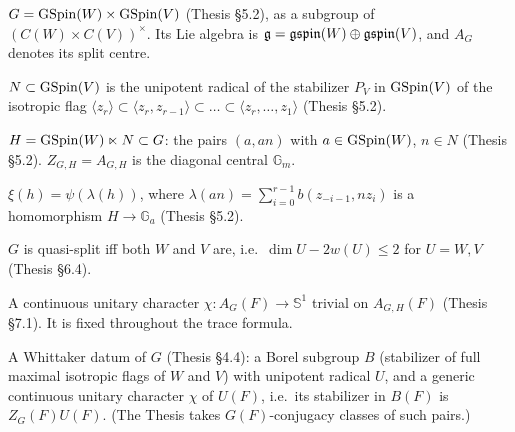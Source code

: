 \begin{definition}
\label{G}
\leanok
{}
$G = \mathrm{GSpin}(W)\times\mathrm{GSpin}(V)$ (Thesis \S5.2), as a subgroup of $(C(W)\times C(V))^\times$.
Its Lie algebra is $\mathfrak g = \mathfrak{gspin}(W)\oplus\mathfrak{gspin}(V)$, and $A_G$ denotes its split centre.
\end{definition}

\begin{definition}
\label{N}
\leanok
{}
$N\subset \mathrm{GSpin}(V)$ is the unipotent radical of the stabilizer $P_V$ in $\mathrm{GSpin}(V)$ of the isotropic
flag $\langle z_r\rangle\subset\langle z_r,z_{r-1}\rangle\subset\dots\subset\langle z_r,\dots,z_1\rangle$
(Thesis \S5.2).
\end{definition}

\begin{definition}
\label{H}
\leanok
{}
$H = \mathrm{GSpin}(W)\ltimes N\subset G$: the pairs $(a, an)$ with $a\in\mathrm{GSpin}(W)$, $n\in N$
(Thesis \S5.2). $Z_{G,H}=A_{G,H}$ is the diagonal central $\mathbb{G}_m$.
\end{definition}

\begin{definition}
\label{xi}
\leanok
{}
$\xi(h) = \psi(\lambda(h))$, where $\lambda(an) = \sum_{i=0}^{r-1} b(z_{-i-1}, n z_i)$ is a
homomorphism $H\to\mathbb{G}_a$ (Thesis \S5.2).
\end{definition}

\begin{definition}
\label{IsQuasiSplit}
\leanok
{}
$G$ is quasi-split iff both $W$ and $V$ are, i.e.\ $\dim U-2w(U)\le 2$ for $U=W,V$ (Thesis \S6.4).
\end{definition}

\begin{definition}
\label{CentralCharOn}
\leanok
{}
A continuous unitary character $\chi: A_G(F)\to\mathbb{S}^1$ trivial on $A_{G,H}(F)$
(Thesis \S7.1). It is fixed throughout the trace formula.
\end{definition}

\begin{definition}
\label{WhittakerDatum}
\leanok
{}
A Whittaker datum of $G$ (Thesis \S4.4): a Borel subgroup $B$ (stabilizer of full maximal isotropic
flags of $W$ and $V$) with unipotent radical $U$, and a generic continuous unitary character $\chi$
of $U(F)$, i.e.\ its stabilizer in $B(F)$ is $Z_G(F)U(F)$. (The Thesis takes $G(F)$-conjugacy classes
of such pairs.)
\end{definition}

